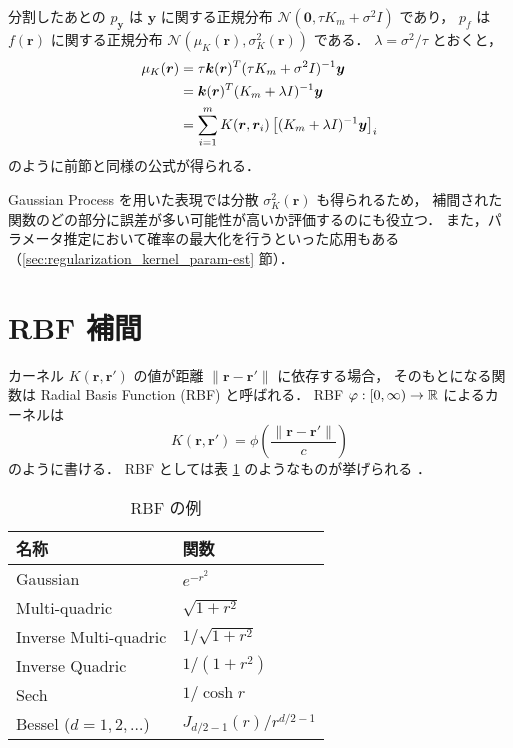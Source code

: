 分割したあとの
$p_{\bm{y}}$ は $\bm{y}$ に関する正規分布 $\mathcal{N}(\bm{0}, \tau K_m + \sigma^2 I)$ であり，
$p_f$ は $f(\bm{r})$ に関する正規分布 $\mathcal{N}(\mu_K(\bm{r}), \sigma_K^2(\bm{r}))$ である．
$\lambda = \sigma^2 / \tau$ とおくと，
\begin{align}
    \mu_K(\bm{r})
     & = \tau \bm{k}(\bm{r})^T (\tau K_m + \sigma^2 I)^{-1} \bm{y}
    \notag                                                                               \\
     & = \bm{k}(\bm{r})^T (K_m + \lambda I)^{-1} \bm{y}
    \notag                                                                               \\
     & = \sum_{i = 1}^m K(\bm{r}, \bm{r}_i) \left[(K_m + \lambda I)^{-1} \bm{y}\right]_i
\end{align}
のように前節と同様の公式が得られる．

Gaussian Process を用いた表現では分散 $\sigma_K^2(\bm{r})$ も得られるため，
補間された関数のどの部分に誤差が多い可能性が高いか評価するのにも役立つ．
また，パラメータ推定において確率の最大化を行うといった応用もある
（\ref{sec:regularization_kernel_param-est} 節）．

\section{RBF 補間}\label{sec:interp_kernel_rbf}

カーネル $K(\bm{r}, \bm{r}')$ の値が距離 $\|\bm{r} - \bm{r}'\|$ に依存する場合，
そのもとになる関数は Radial Basis Function (RBF) と呼ばれる．
RBF $\varphi : [0, \infty) \to \mathbb{R}$ によるカーネルは
\begin{equation}
    K(\bm{r}, \bm{r}') = \phi\left(\frac{\|\bm{r} - \bm{r}'\|}{c}\right)
    \label{eq:regularization_kernel_kernel-of-rbf}
\end{equation}
のように書ける．
RBF としては表
\ref{table:interp_kernel_example-rbfs}
のようなものが挙げられる
\cite{Brochu2010,Fornberg2015}．

\begin{table}[bp]
    \caption{RBF の例 \cite{Brochu2010,Fornberg2015}}
    \label{table:interp_kernel_example-rbfs}
    \centering
    \begin{tabular}{ll}
        名称                      & 関数                         \\
        \hline
        Gaussian                & $e^{-r^2}$                 \\
        Multi-quadric           & $\sqrt{1 + r^2}$           \\
        Inverse Multi-quadric   & $1/\sqrt{1 + r^2}$         \\
        Inverse Quadric         & $1 / (1 + r^2)$            \\
        Sech                    & $1 / \cosh{r}$             \\
        Bessel ($d=1,2,\ldots$) & $J_{d/2-1}(r) / r^{d/2-1}$
    \end{tabular}
\end{table}

